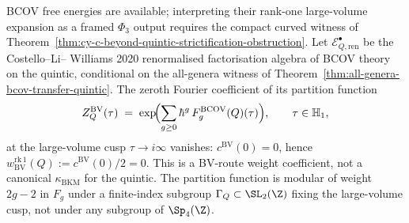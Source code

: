 \begin{theorem}
\label{thm:quintic-path-2-bv-sl2}
BCOV free energies are available; interpreting their rank-one
large-volume expansion as a framed $\Phi_3$ output requires the compact
curved witness of
Theorem~\ref{thm:cy-c-beyond-quintic-strictification-obstruction}.
Let $\mathcal{E}^\bullet_{Q, \mathrm{ren}}$ be the Costello--Li--
Williams 2020 renormalised factorisation algebra of BCOV theory on
the quintic, conditional on the all-genera witness of
Theorem~\ref{thm:all-genera-bcov-transfer-quintic}. The zeroth
Fourier coefficient of its partition function
\[
 Z^{\mathrm{BV}}_Q(\tau) \;=\; \exp\!\Bigl(\sum_{g \geq 0} \hbar^g\,
 F_g^{\mathrm{BCOV}}(Q)(\tau)\Bigr),
 \qquad \tau \in \mathbb{H}_1,
\]
at the large-volume cusp $\tau \to i \infty$ vanishes:
$c^{\mathrm{BV}}(0) = 0$, hence
$w_{\mathrm{BV}}^{\mathrm{rk}\,1}(Q) :=
c^{\mathrm{BV}}(0)/2 = 0$. This is a BV-route weight coefficient,
not a canonical $\kappa_{\mathrm{BKM}}$ for the quintic. The partition function is modular of
weight $2g - 2$ in $F_g$ under a finite-index subgroup
$\Gamma_Q \subset \SL_2(\Z)$ fixing the large-volume cusp, not
under any subgroup of $\Sp_4(\Z)$.
\end{theorem}

